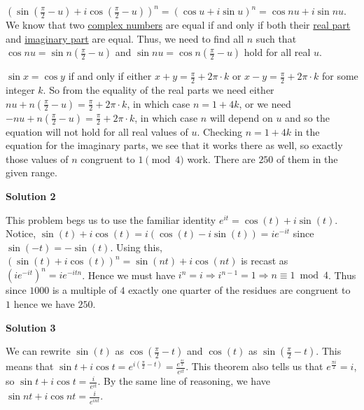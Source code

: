 \begin{enumerate}
 $\left(\sin\left(\frac\pi2 - u\right) + i \cos\left(\frac\pi 2 - u\right)\right)^n = \left(\cos u + i \sin u\right)^n = \cos nu + i\sin nu$.  We know that two \href{https://artofproblemsolving.com/wiki/index.php?title=Complex\_number}{complex numbers} are equal if and only if both their \href{https://artofproblemsolving.com/wiki/index.php?title=Real\_part}{real part} and \href{https://artofproblemsolving.com/wiki/index.php?title=Imaginary\_part}{imaginary part} are equal.  Thus, we need to find all $n$ such that $\cos n u = \sin n\left(\frac\pi2 - u\right)$ and $\sin nu = \cos n\left(\frac\pi2 - u\right)$ hold for all real $u$.

 $\sin x = \cos y$ if and only if either $x + y = \frac \pi 2 + 2\pi \cdot k$ or $x - y = \frac\pi2 + 2\pi\cdot k$ for some integer $k$.  So from the equality of the real parts we need either $nu + n\left(\frac\pi2 - u\right) = \frac\pi 2 + 2\pi \cdot k$, in which case $n = 1 + 4k$, or we need $-nu + n\left(\frac\pi2 - u\right) = \frac\pi 2 + 2\pi \cdot k$, in which case $n$ will depend on $u$ and so the equation will not hold for all real values of $u$.  Checking $n = 1 + 4k$ in the equation for the imaginary parts, we see that it works there as well, so exactly those values of $n$ congruent to $1 \pmod 4$ work.  There are $\boxed{250}$ of them in the given range.

 



\textbf{Solution 2}

This problem begs us to use the familiar identity $e^{it} = \cos(t) + i \sin(t)$. Notice, $\sin(t) + i \cos(t) = i(\cos(t) - i \sin(t)) = i e^{-it}$ since $\sin(-t) = -\sin(t)$. Using this, $(\sin(t) + i \cos(t))^n = \sin(nt) + i \cos(nt)$ is recast as $(i e^{-it})^n = i e^{-itn}$. Hence we must have $i^n = i \Rightarrow i^{n-1} = 1 \Rightarrow n \equiv 1 \bmod{4}$. Thus since $1000$ is a multiple of $4$ exactly one quarter of the residues are congruent to $1$ hence we have $\boxed{250}$.

 



\textbf{Solution 3}

We can rewrite $\sin(t)$ as $\cos\left(\frac{\pi}{2}-t\right)$ and $\cos(t)$ as $\sin\left(\frac{\pi}{2}-t\right)$. This means that $\sin t + i\cos t = e^{i\left(\frac{\pi}{2}-t\right)}=\frac{e^{\frac{\pi i}{2}}}{e^{it}}$. This theorem also tells us that $e^{\frac{\pi i}{2}}=i$, so $\sin t + i\cos t = \frac{i}{e^{it}}$. By the same line of reasoning, we have $\sin nt + i\cos nt = \frac{i}{e^{int}}$.


\end{enumerate}

